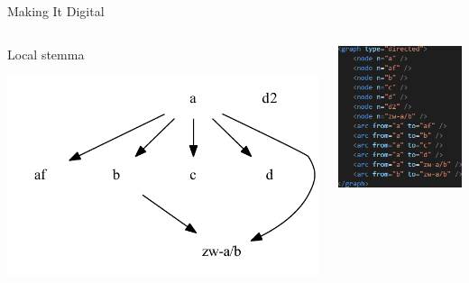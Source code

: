 \documentclass[10pt]{beamer}
\begin{document}
	\begin{frame}{Making It Digital}
		\begin{columns}
			\begin{column}{0.55\textwidth}
				\begin{center}
					Local stemma
				\end{center}
				\includegraphics[width=\textwidth]{../graphics/B25K1V4U22-26-local-stemma-no-legend.pdf}
			\end{column}
			\begin{column}{0.4\textwidth}
				\includegraphics[scale=0.6667]{../graphics/local-stemma-xml.png}
			\end{column}
		\end{columns}
	\end{frame}
\end{document}

